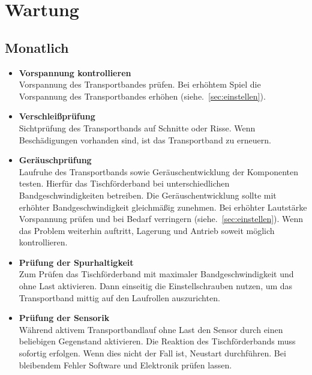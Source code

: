 %
%

\chapter{Wartung}

\section{Monatlich}

\begin{itemize}
	
	\item \textbf{Vorspannung kontrollieren} \\
	Vorspannung des Transportbandes prüfen. Bei erhöhtem Spiel die Vorspannung des Transportbandes erhöhen (siehe.~\ref{sec:einstellen}).
	
	\item \textbf{Verschleißprüfung} \\
	Sichtprüfung des Transportbands auf Schnitte oder Risse. Wenn Beschädigungen vorhanden sind, ist das Transportband zu erneuern.
	
	\item \textbf{Geräuschprüfung} \\
	Laufruhe des Transportbands sowie Geräuschentwicklung der Komponenten testen. Hierfür das Tischförderband bei unterschiedlichen Bandgeschwindigkeiten betreiben. Die Geräuschentwicklung sollte mit erhöhter Bandgeschwindigkeit gleichmäßig zunehmen. Bei erhöhter Lautstärke Vorspannung prüfen und bei Bedarf verringern (siehe.~\ref{sec:einstellen}). Wenn das Problem weiterhin auftritt, Lagerung und Antrieb soweit möglich kontrollieren.
	
	\item \textbf{Prüfung der Spurhaltigkeit} \\
	Zum Prüfen das Tischförderband mit maximaler Bandgeschwindigkeit und ohne Last aktivieren. Dann einseitig die Einstellschrauben nutzen, um das Transportband mittig auf den Laufrollen auszurichten.
	
	\item \textbf{Prüfung der Sensorik} \\
	Während aktivem Transportbandlauf ohne Last den Sensor durch einen beliebigen Gegenstand aktivieren. Die Reaktion des Tischförderbands muss sofortig erfolgen. Wenn dies nicht der Fall ist, Neustart durchführen. Bei bleibendem Fehler Software und Elektronik prüfen lassen.
	
\end{itemize}

